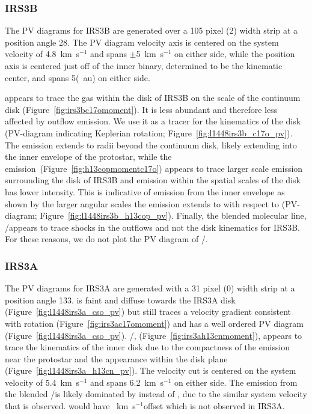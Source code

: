 \documentclass[twocolumn, 12pt, trackchanges]{aastex63}
\begin{document}
\subsubsection{IRS3B}
The PV diagrams for IRS3B are generated over a 105 pixel (2) width strip at a position angle 28\deg. The PV diagram velocity axis is centered on the system velocity of 4.8~km~s$^{-1}$ \citep[][]{2016Natur.538..483T} and spans $\pm$5~km~s$^{-1}$ on either side, while the position axis is centered just off of the inner binary, determined to be the kinematic center, and spans 5\arcsec\space(~au) on either side.

\cso\space appears to trace the gas within the disk of IRS3B on the scale of the continuum disk (Figure~\ref{fig:irs3bc17omoment}). It is less abundant and therefore less affected by outflow emission. We use it as a tracer for the kinematics of the disk (PV-diagram indicating Keplerian rotation; Figure~\ref{fig:l1448irs3b_c17o_pv}). The \cso\space emission extends to radii beyond the continuum disk, likely extending into the inner envelope of the protostar, while the \htcop\space emission~(Figure~\ref{fig:h13copmomentc17o}) appears to trace larger scale emission surrounding the disk of IRS3B and emission within the spatial scales of the disk has lower intensity. This is indicative of emission from the inner envelope as shown by the larger angular scales the emission extends to with respect to \cso\space (\htcop\space PV-diagram; Figure~\ref{fig:l1448irs3b_h13cop_pv}). Finally, the blended molecular line, \htcn/\sot\space appears to trace shocks in the outflows and not the disk kinematics for IRS3B. For these reasons, we do not plot the PV diagram of \htcn/\sot.

\subsubsection{IRS3A}
The PV diagrams for IRS3A are generated with a 31 pixel (0) width strip at a position angle 133\deg. \cso\space is faint and diffuse towards the IRS3A disk (Figure~\ref{fig:l1448irs3a_cso_pv}) but still traces a velocity gradient consistent with rotation (Figure~\ref{fig:irs3ac17omoment}) and has a well ordered PV diagram (Figure~\ref{fig:l1448irs3a_cso_pv}). \htcn/\sot, (Figure~\ref{fig:irs3ah13cnmoment}), appears to trace the kinematics of the inner disk due to the compactness of the emission near the protostar and the appearance within the disk plane (Figure~\ref{fig:l1448irs3a_h13cn_pv}). The velocity cut is centered on the system velocity of 5.4~km~s$^{-1}$ and spans 6.2~km~s$^{-1}$ on either side. The emission from the blended \htcn/\sot\space is likely dominated by \htcn\space instead of \sot, due to the similar system velocity that is observed. \sot\space would have ~km~s$^{-1}$\space offset which is not observed in IRS3A.
\end{document}
